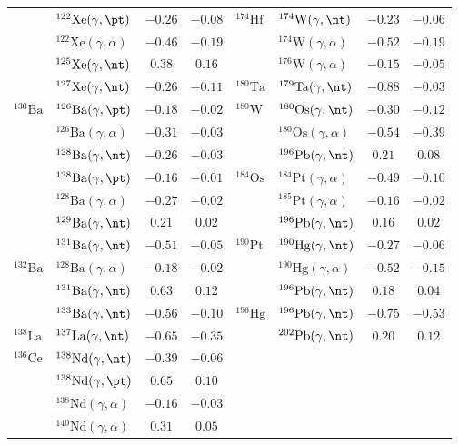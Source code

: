 {\begin{longtable}{llcc llcc}
$ $ & $^{122}\mathrm{Xe}(\gamma,\pt)$ & $-0.26$ & $-0.08$ & $^{174}\mathrm{Hf}$ & $^{174}\mathrm{W}(\gamma,\nt)$ & $-0.23$ & $-0.06$ \\ 
$ $ & $^{122}\mathrm{Xe}(\gamma,\alpha)$ & $-0.46$ & $-0.19$ & $ $ & $^{174}\mathrm{W}(\gamma,\alpha)$ & $-0.52$ & $-0.19$ \\ 
$ $ & $^{125}\mathrm{Xe}(\gamma,\nt)$ & $0.38$ & $0.16$ & $ $ & $^{176}\mathrm{W}(\gamma,\alpha)$ & $-0.15$ & $-0.05$ \\ 
$ $ & $^{127}\mathrm{Xe}(\gamma,\nt)$ & $-0.26$ & $-0.11$ & $^{180}\mathrm{Ta}$ & $^{179}\mathrm{Ta}(\gamma,\nt)$ & $-0.88$ & $-0.03$ \\ 
$^{130}\mathrm{Ba}$ & $^{126}\mathrm{Ba}(\gamma,\pt)$ & $-0.18$ & $-0.02$ & $^{180}\mathrm{W}$ & $^{180}\mathrm{Os}(\gamma,\nt)$ & $-0.30$ & $-0.12$ \\ 
$ $ & $^{126}\mathrm{Ba}(\gamma,\alpha)$ & $-0.31$ & $-0.03$ & $ $ & $^{180}\mathrm{Os}(\gamma,\alpha)$ & $-0.54$ & $-0.39$ \\ 
$ $ & $^{128}\mathrm{Ba}(\gamma,\nt)$ & $-0.26$ & $-0.03$ & $ $ & $^{196}\mathrm{Pb}(\gamma,\nt)$ & $0.21$ & $0.08$ \\ 
$ $ & $^{128}\mathrm{Ba}(\gamma,\pt)$ & $-0.16$ & $-0.01$ & $^{184}\mathrm{Os}$ & $^{184}\mathrm{Pt}(\gamma,\alpha)$ & $-0.49$ & $-0.10$ \\ 
$ $ & $^{128}\mathrm{Ba}(\gamma,\alpha)$ & $-0.27$ & $-0.02$ & $ $ & $^{185}\mathrm{Pt}(\gamma,\alpha)$ & $-0.16$ & $-0.02$ \\ 
$ $ & $^{129}\mathrm{Ba}(\gamma,\nt)$ & $0.21$ & $0.02$ & $ $ & $^{196}\mathrm{Pb}(\gamma,\nt)$ & $0.16$ & $0.02$ \\ 
$ $ & $^{131}\mathrm{Ba}(\gamma,\nt)$ & $-0.51$ & $-0.05$ & $^{190}\mathrm{Pt}$ & $^{190}\mathrm{Hg}(\gamma,\nt)$ & $-0.27$ & $-0.06$ \\ 
$^{132}\mathrm{Ba}$ & $^{128}\mathrm{Ba}(\gamma,\alpha)$ & $-0.18$ & $-0.02$ & $ $ & $^{190}\mathrm{Hg}(\gamma,\alpha)$ & $-0.52$ & $-0.15$ \\ 
$ $ & $^{131}\mathrm{Ba}(\gamma,\nt)$ & $0.63$ & $0.12$ & $ $ & $^{196}\mathrm{Pb}(\gamma,\nt)$ & $0.18$ & $0.04$ \\ 
$ $ & $^{133}\mathrm{Ba}(\gamma,\nt)$ & $-0.56$ & $-0.10$ & $^{196}\mathrm{Hg}$ & $^{196}\mathrm{Pb}(\gamma,\nt)$ & $-0.75$ & $-0.53$ \\ 
$^{138}\mathrm{La}$ & $^{137}\mathrm{La}(\gamma,\nt)$ & $-0.65$ & $-0.35$ & $ $ & $^{202}\mathrm{Pb}(\gamma,\nt)$ & $0.20$ & $0.12$ \\ 
$^{136}\mathrm{Ce}$ & $^{138}\mathrm{Nd}(\gamma,\nt)$ & $-0.39$ & $-0.06$ & $ $ & $ $ &  &  \\ 
$ $ & $^{138}\mathrm{Nd}(\gamma,\pt)$ & $0.65$ & $0.10$ & $ $ & $ $ &  &  \\ 
$ $ & $^{138}\mathrm{Nd}(\gamma,\alpha)$ & $-0.16$ & $-0.03$ & $ $ & $ $ &  &  \\ 
$ $ & $^{140}\mathrm{Nd}(\gamma,\alpha)$ & $0.31$ & $0.05$ & $ $ & $ $ &  &  \\ 
\end{longtable}
}

